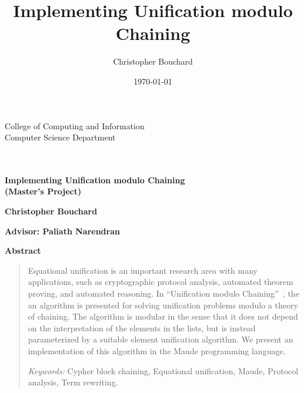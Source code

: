 \documentclass[11pt]{article}
\title{Implementing Unification modulo Chaining}
\author{Christopher Bouchard}
\date{\today}
\begin{document}
\begin{titlepage}
    {\vspace*{-1in}\hspace*{-.5in}
    \parbox{7.25in}{
    \setlength{\baselineskip}{13pt}
    \makebox{\ } \hfill {\footnotesize College of Computing and Information} \\
    \makebox{\ } \hfill {\footnotesize Computer Science Department} \\
    \makebox{\ } \\
    \\
    }
    \vspace{-.95in}}

    \epsfxsize=3.15in
    \epsfclipon

    \vspace*{2in}

    \begin{center}
        \textbf{\huge Implementing Unification modulo Chaining} \\[+15pt]
        \textbf{(Master's Project)}
        \par
    \end{center}

    \vspace{2in}

    \begin{center}
    \textbf{\large Christopher Bouchard}\\

    \par\end{center}{\large \par}

    \begin{center}
    \textbf{\large \vspace{0.5in}
    Advisor: Paliath Narendran }\textbf{ }
    \par\end{center}
\end{titlepage}

\begin{center}
    \textbf{Abstract}
\end{center}
\begin{quotation}
Equational unification is an important research area with many applications,
such as cryptographic protocol analysis, automated theorem proving, and
automated reasoning. In ``Unification modulo
Chaining''~\cite{anantharaman2012unification}, the an algorithm is presented
for solving unification problems modulo a theory of chaining. The algorithm is
modular in the sense that it does not depend on the interpretation of the
elements in the lists, but is instead parameterized by a suitable element
unification algorithm. We present an implementation of this algorithm in the
Maude programming language.

\medskip{}
\textit{Keywords:} Cypher block chaining, Equational unification, Maude, Protocol
analysis, Term rewriting.
\end{quotation}
\end{document}
